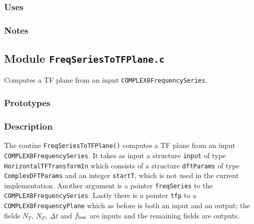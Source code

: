 \subsubsection*{Uses}

\subsubsection*{Notes}

\vfill{\footnotesize}

\newpage
\subsection{Module \texttt{FreqSeriesToTFPlane.c}}
\label{ss:FreqSeriesToTFPlane.c}

Computes a TF plane from an input \verb+COMPLEX8FrequencySeries+.

\subsubsection*{Prototypes}
\vspace{0.1in}


\subsubsection*{Description}

The routine \verb+FreqSeriesToTFPlane()+ computes a TF plane from an input
\verb+COMPLEX8FrequencySeries+.  It takes as input a structure \verb+input+ of
type \verb+HorizontalTFTransformIn+ which consists of a structure
\verb+dftParams+ of type \verb+ComplexDFTParams+ and an integer \verb+startT+,
which is not used in the current implementation.  Another argument is a
pointer \verb+freqSeries+ to the \verb+COMPLEX8FrequencySeries+.  Lastly there
is a pointer \verb+tfp+ to a \verb+COMPLEX8FrequencyPlane+ which as before is
both an input and an output; the fields $N_T$, $N_F$, ${\overline {\Delta t}}$
and $f_{\rm low}$ are inputs and the remaining fields are outputs.


